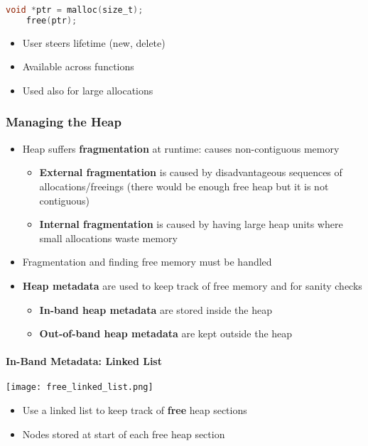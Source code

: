 \begin{lstlisting}[language={C}]
    void *ptr = malloc(size_t);
    free(ptr);                  
\end{lstlisting}
\begin{itemize}
    \item User steers lifetime (new, delete)
    \item Available across functions
    \item Used also for large allocations
\end{itemize}

\subsubsection{Managing the Heap}
\begin{itemize}
    \item Heap suffers \textbf{fragmentation} at runtime: causes non-contiguous memory
          \noindent\begin{itemize}
              \item \textbf{External fragmentation} is caused by disadvantageous sequences of allocations/freeings (there would be enough free heap but it is not contiguous)
              \item \textbf{Internal fragmentation} is caused by having large heap units where small allocations waste memory
          \end{itemize}
    \item Fragmentation and finding free memory must be handled
    \item \textbf{Heap metadata} are used to keep track of free memory and for sanity checks
          \noindent\begin{itemize}
              \item \textbf{In-band heap metadata} are stored inside the heap
              \item \textbf{Out-of-band heap metadata} are kept outside the heap
          \end{itemize}
\end{itemize}

\paragraph{In-Band Metadata: Linked List}
\texttt{[image: free\_linked\_list.png]}

\begin{itemize}
    \item Use a linked list to keep track of \textbf{free} heap sections
    \item Nodes stored at start of each free heap section
\end{itemize}

